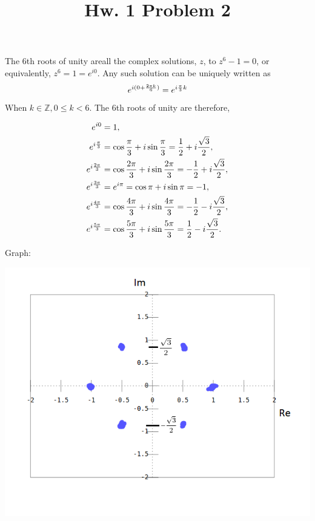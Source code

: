 \documentclass[12pt]{article}
\newcommand{\Z}{\mathbb{Z}}
\begin{document}
\title{Hw. 1 Problem 2}
\maketitle


The 6th roots of unity areall the complex solutions, $z$, to $z^6-1=0$, or equivalently, $z^6= 1 = e^{i0}$. Any such solution can be uniquely written as $$e^{i(0+{2\pi k\over 6})}= e^{i{\pi\over3}k}$$
When $k\in \Z, 0\le k < 6$. The 6th roots of unity are therefore,

\begin{align*}
e^{i0}&=1,\\
e^{i{\pi\over3}}&=\cos {\pi\over 3} + i\sin{\pi\over 3} = {1\over2}+i{\sqrt{3}\over2},\\ 
e^{i{2\pi\over3}}&=\cos {2\pi\over 3} + i\sin{2\pi\over 3} = -{1\over2}+i{\sqrt{3}\over2},\\
e^{i{3\pi\over3}}&=e^{i\pi}=\cos {\pi} + i\sin{\pi} = -1,\\
e^{i{4\pi\over3}}&=\cos {4\pi\over 3} + i\sin{4\pi\over 3} = -{1\over2}-i{\sqrt{3}\over2},\\
e^{i{5\pi\over3}}&=\cos {5\pi\over 3} + i\sin{5\pi\over 3} = {1\over2}-i{\sqrt{3}\over2}.
\end{align*}

\newpage
Graph:

\includegraphics[scale=0.8]{q2}
\end{document}

